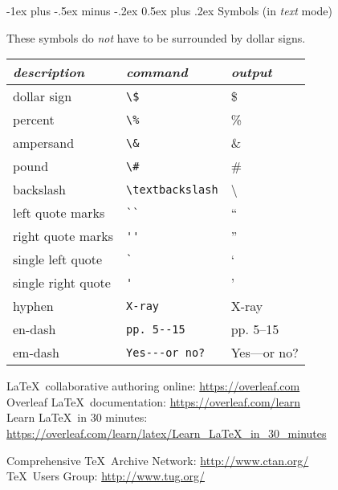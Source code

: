 \documentclass[10pt,landscape,letterpaper]{article}
\makeatletter
\renewcommand{\section}{\@startsection{section}{1}{0mm}%
                                {-1ex plus -.5ex minus -.2ex}%
                                {0.5ex plus .2ex}%
                                {\sffamily\large}}
\makeatother
\begin{document}
\begin{multicols}{3}
\section{Symbols (in \emph{text} mode)}

These symbols do \emph{not} have to be surrounded by dollar signs.

\begin{tabular}{lll}
\toprule
\emph{description} & \emph{command} & \emph{output}\\
\midrule
dollar sign & \verb!\$! & \$ \\
percent & \verb!\%! & \% \\
ampersand & \verb!\&! & \& \\
pound & \verb!\#! & \# \\
backslash & \verb!\textbackslash! & \textbackslash \\
left quote marks & \verb!``! & `` \\
right quote marks & \verb!''! & '' \\
single left quote  & \verb!`! & ` \\
single right quote  & \verb!'! & ' \\
hyphen & \verb!X-ray! & X-ray\\
en-dash & \verb!pp. 5--15! & pp. 5--15 \\
em-dash & \verb!Yes---or no?! & Yes---or no? \\
\bottomrule
\end{tabular}

\LaTeX\ collaborative authoring online: \url{https://overleaf.com}\\
Overleaf \LaTeX\ documentation: \url{https://overleaf.com/learn}\\
Learn \LaTeX\ in 30 minutes:\\ \url{https://overleaf.com/learn/latex/Learn_LaTeX_in_30_minutes}

\vfill
{Comprehensive \TeX\ Archive Network}: \url{http://www.ctan.org/}\\
{\TeX\ Users Group: }\url{http://www.tug.org/}


\end{multicols}
\end{document}
